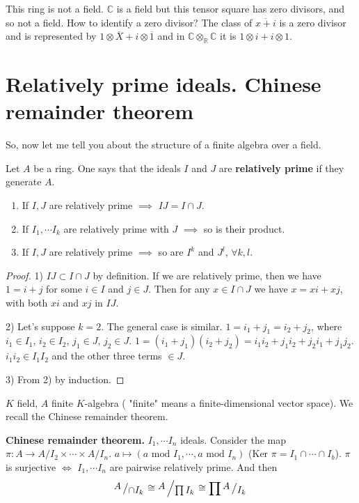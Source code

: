 This ring is not a field. $\mathbb{C}$ is a field but this tensor square has zero divisors, and so not a field. How to identify a zero divisor? The class of $\overbar{x+i}$ is a zero divisor and is represented by $1\otimes \overbar{X}+ i\otimes\overbar{1}$ and in $\mathbb{C}\otimes_{\mathbb{R}} \mathbb{C}$ it is $1\otimes i + i\otimes 1$.

\section{Relatively prime ideals. Chinese remainder theorem}

So, now let me tell you about the structure of a finite algebra over a field. 

\begin{definition}
Let $A$ be a ring. One says that the ideals $I$ and $J$ are \textbf{relatively prime} if they generate $A$.
\end{definition}

\begin{lemma}
\begin{enumerate}
\item If $I, J$ are relatively prime $\implies$ $IJ=I\cap J$.
\item If $I_1,\cdots I_k$ are relatively prime with $J$ $\implies$ so is their product.
\item If $I, J$ are relatively prime $\implies$ so are $I^k$ and $J^l$, $\forall k,l$. 
\end{enumerate}
\end{lemma}

\begin{proof}
1) $IJ\subset I\cap J$ by definition. If we are relatively prime, then we have $1=i + j$ for some $i \in I$ and $j \in J$. Then for any $x\in I\cap J$ we have $x = xi + xj$, with both $xi$ and $xj$ in $IJ$.

2) Let's suppose $k = 2$. The general case is similar. $1 = i_1 + j_1 = i_2 + j_2$, where $i_1 \in I_1$, $i_2 \in I_2$, $j_1\in J$, $j_2 \in J$. $1 = (i_1 + j_1)(i_2 + j_2)=i_1 i_2 + j_1 i_2 + j_2 i_1 + j_1 j_2$. $i_1 i_2\in I_1I_2$ and the other three terms $\in J$. 

3) From 2) by induction. 
\end{proof} 

$K$ field, $A$ finite $K$-algebra ( "finite" means a finite-dimensional vector space). We recall the Chinese remainder theorem. 

\begin{theorem} \textbf{Chinese remainder theorem.}
$I_1,\cdots I_n$ ideals. Consider the map $\pi: A \to A/I_2 \times \cdots \times A/I_n$. $a \mapsto (a\text{ mod }I_1, \cdots, a\text{ mod }I_n)$ ($\text{Ker }\pi=I_1\cap\cdots\cap I_b$). $\pi$ is surjective $\iff$ $I_1,\cdots I_n$ are pairwise relatively prime. And then 
\[
\bigslant{A}{\cap I_k}\cong\bigslant{A}{\prod I_k}\cong \prod \bigslant{A}{I_k}
\]
\end{theorem}

